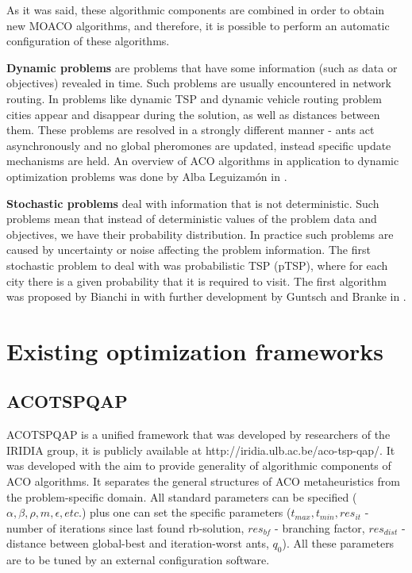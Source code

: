 \documentclass[12pt]{article}
\begin{document}
As it was said, these algorithmic components are combined in order to obtain new MOACO algorithms, and therefore, it is possible to perform an automatic configuration of these algorithms.


\textbf{Dynamic problems} are problems that have some information (such as data or objectives) revealed in time. Such problems are usually encountered in network routing. In problems like dynamic TSP and dynamic vehicle routing problem cities appear and disappear during the solution, as well as distances between them. These problems are resolved in a strongly different manner - ants act asynchronously and no global pheromones are updated, instead specific update mechanisms are held. An overview of ACO algorithms in application to dynamic optimization problems was done by Alba Leguizam{\'o}n in \cite{dynamic_overview}.

\textbf{Stochastic problems} deal with information that is not deterministic. Such problems mean that instead of deterministic values of the problem data and objectives, we have their probability distribution. In practice such problems are caused by uncertainty or noise affecting the problem information. The first stochastic problem to deal with was probabilistic TSP (pTSP), where for each city there is a given probability that it is required to visit. The first algorithm was proposed by Bianchi in \cite{bianchi_stochastic_tsp} with further development by Guntsch and Branke in \cite{guntsch_stochastic}.






\section{Existing optimization frameworks}

\subsection{ACOTSPQAP}

ACOTSPQAP is a unified framework that was developed by researchers of the IRIDIA group, it is publicly available at http://iridia.ulb.ac.be/aco-tsp-qap/. It was developed with the aim to provide generality of algorithmic components of ACO algorithms. It separates the general structures of ACO metaheuristics from the problem-specific domain. All standard parameters can be specified ($\alpha, \beta, \rho, m, \epsilon, etc.$) plus one can set the specific parameters ($t_{max}, t_{min}, res_{it}$ - number of iterations since last found rb-solution, $res_{bf}$ - branching factor, $res_{dist}$ - distance between global-best and iteration-worst ants, $q_0$). All these parameters are to be tuned by an external configuration software.
\end{document}
